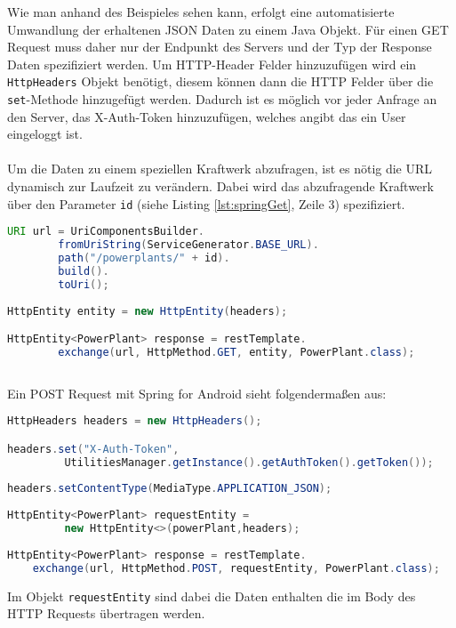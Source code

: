 Wie man anhand des Beispieles sehen kann, erfolgt eine automatisierte Umwandlung der erhaltenen JSON Daten zu einem Java Objekt. Für einen GET Request muss daher nur der Endpunkt des Servers und der Typ der Response Daten spezifiziert werden. Um HTTP-Header Felder hinzuzufügen wird ein \texttt{HttpHeaders} Objekt benötigt, diesem können dann die HTTP Felder über die \texttt{set}-Methode hinzugefügt werden. Dadurch ist es möglich vor jeder Anfrage an den Server, das X-Auth-Token hinzuzufügen, welches angibt das ein User eingeloggt ist.
\\\\
Um die Daten zu einem speziellen Kraftwerk abzufragen, ist es nötig die URL dynamisch zur Laufzeit zu verändern. Dabei wird das abzufragende Kraftwerk über den Parameter \texttt{id} (siehe Listing \ref{lst:springGet}, Zeile 3) spezifiziert.

\begin{lstlisting}[language=java, caption={Abfrage der Daten zu einem speziellen Kraftwerke},label={lst:springGet}, frame=single]
URI url = UriComponentsBuilder.
		fromUriString(ServiceGenerator.BASE_URL).
		path("/powerplants/" + id).
		build().
		toUri();
		
HttpEntity entity = new HttpEntity(headers);

HttpEntity<PowerPlant> response = restTemplate.
		exchange(url, HttpMethod.GET, entity, PowerPlant.class);		
		
\end{lstlisting}

\newpage
Ein POST Request mit Spring for Android sieht folgendermaßen aus: 

\begin{lstlisting}[language=java, caption={POST Request um ein neues Kraftwerke anzulegen}, label=lst:getAllPowerPlants, frame=single, tabsize=3]
HttpHeaders headers = new HttpHeaders();

headers.set("X-Auth-Token", 
		 UtilitiesManager.getInstance().getAuthToken().getToken());
		 
headers.setContentType(MediaType.APPLICATION_JSON);
 
HttpEntity<PowerPlant> requestEntity = 
		 new HttpEntity<>(powerPlant,headers);
 
HttpEntity<PowerPlant> response = restTemplate.
	exchange(url, HttpMethod.POST, requestEntity, PowerPlant.class);
\end{lstlisting}

Im Objekt \texttt{requestEntity} sind dabei die Daten enthalten die im Body des HTTP Requests übertragen werden.

